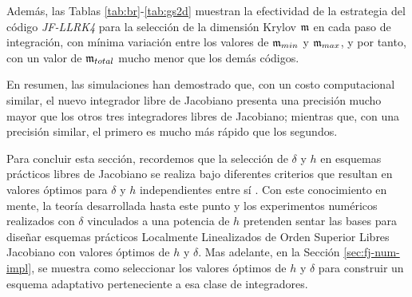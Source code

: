 Además, las Tablas \ref{tab:br}-\ref{tab:gs2d} muestran la efectividad de la estrategia del código \textit{JF-LLRK4} para la selección de la dimensión Krylov $\mathfrak{m}$ en cada paso de integración, con mínima variación entre los valores de $\mathfrak{m}_{min}$ y $\mathfrak{m}_{max}$, y por tanto, con un valor de $\mathfrak{m}_{total}$ mucho menor que los demás códigos.

En resumen, las simulaciones han demostrado que, con un costo computacional similar, el nuevo integrador libre de Jacobiano presenta una precisión mucho mayor que los otros tres integradores libres de Jacobiano; mientras que, con una precisión similar, el primero es mucho más rápido que los segundos.

Para concluir esta sección, recordemos que la selección de $\delta$ y $h$ en esquemas prácticos libres de Jacobiano se realiza bajo diferentes criterios que resultan en valores óptimos para $\delta$ y $h$ independientes entre sí \cite{knoll2004jacobian}. Con este conocimiento en mente, la teoría desarrollada hasta este punto y los experimentos numéricos realizados con $\delta$ vinculados a una potencia de $h$ pretenden sentar las bases para diseñar esquemas prácticos Localmente Linealizados de Orden Superior Libres Jacobiano con valores óptimos de $h$ y $\delta$. Mas adelante, en la Sección \ref{sec:fj-num-impl}, se muestra como seleccionar los valores óptimos de $h$ y $\delta$ para construir un esquema adaptativo perteneciente a esa clase de integradores. 


